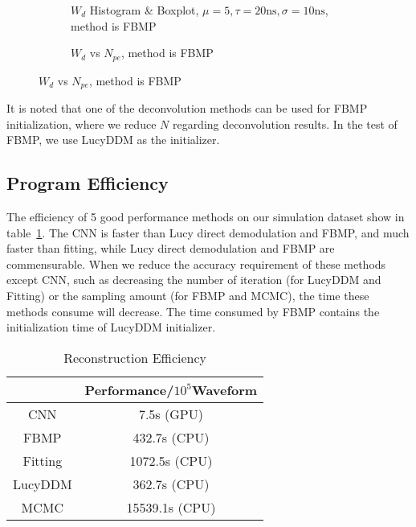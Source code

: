\begin{figure}[H]
\begin{minipage}[t]{.5\textwidth}
\begin{figure}[H]
    \centering
    \resizebox{\textwidth}{!}{}
    \caption{\label{fig:fbmp-hist} $W_{d}$ Histogram \& Boxplot, $\mu=5, \tau=20\mathrm{ns}, \sigma=10\mathrm{ns}$, method is FBMP}
\end{figure}
\end{minipage}
\begin{minipage}[t]{.5\textwidth}
\begin{figure}[H]
    \centering
    \resizebox{\textwidth}{!}{}
    \caption{\label{fig:fbmp-npe} $W_{d}$ vs $N_{pe}$, method is FBMP}
\end{figure}
\end{minipage}
\end{figure}

It is noted that one of the deconvolution methods can be used for FBMP initialization, where we reduce $N$ regarding deconvolution results. In the test of FBMP, we use LucyDDM as the initializer. 

\subsection{Program Efficiency}

The efficiency of 5 good performance methods on our simulation dataset show in table~\ref{fig:efficiency}. The CNN is faster than Lucy direct demodulation and FBMP, and much faster than fitting, while Lucy direct demodulation and FBMP are commensurable. When we reduce the accuracy requirement of these methods except CNN, such as decreasing the number of iteration (for LucyDDM and Fitting) or the sampling amount (for FBMP and MCMC), the time these methods consume will decrease. The time consumed by FBMP contains the initialization time of LucyDDM initializer. 

\begin{table}[H]
    \centering
    \caption{\label{fig:efficiency} Reconstruction Efficiency}
    \begin{tabular}{c|c}
        \hline
        & Performance/$10^{5}$Waveform \\
        \hline
        CNN & 7.5s (GPU) \\
        \hline
        FBMP & 432.7s (CPU) \\
        \hline
        Fitting & 1072.5s (CPU) \\
        \hline
        LucyDDM & 362.7s (CPU) \\
        \hline
        MCMC & 15539.1s (CPU) \\
        \hline
    \end{tabular}
\end{table}
\hspace{4mm}

